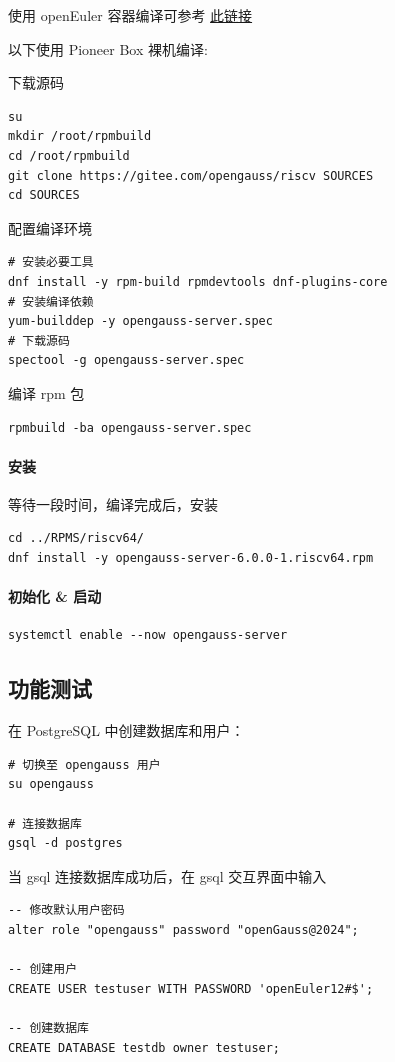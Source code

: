 \documentclass{article}
\begin{document}
使用 openEuler 容器编译可参考 \href{https://github.com/QA-Team-lo/dbtest/blob/main/opengauss/install.md}{此链接}

以下使用 Pioneer Box 裸机编译:

下载源码

\begin{verbatim}
su 
mkdir /root/rpmbuild
cd /root/rpmbuild
git clone https://gitee.com/opengauss/riscv SOURCES
cd SOURCES
\end{verbatim}

配置编译环境

\begin{verbatim}
# 安装必要工具
dnf install -y rpm-build rpmdevtools dnf-plugins-core
# 安装编译依赖
yum-builddep -y opengauss-server.spec
# 下载源码
spectool -g opengauss-server.spec
\end{verbatim}

编译 rpm 包

\begin{verbatim}
rpmbuild -ba opengauss-server.spec
\end{verbatim}

\paragraph{安装}
等待一段时间，编译完成后，安装

\begin{verbatim}
cd ../RPMS/riscv64/
dnf install -y opengauss-server-6.0.0-1.riscv64.rpm
\end{verbatim}

\paragraph{初始化 \& 启动}

\begin{verbatim}
systemctl enable --now opengauss-server
\end{verbatim}

\subsection{功能测试}

在 PostgreSQL 中创建数据库和用户：
\begin{verbatim}
# 切换至 opengauss 用户
su opengauss

# 连接数据库
gsql -d postgres
\end{verbatim}

当 gsql 连接数据库成功后，在 gsql 交互界面中输入
\begin{verbatim}
-- 修改默认用户密码
alter role "opengauss" password "openGauss@2024";

-- 创建用户
CREATE USER testuser WITH PASSWORD 'openEuler12#$';

-- 创建数据库
CREATE DATABASE testdb owner testuser;
\end{verbatim}
\end{document}
